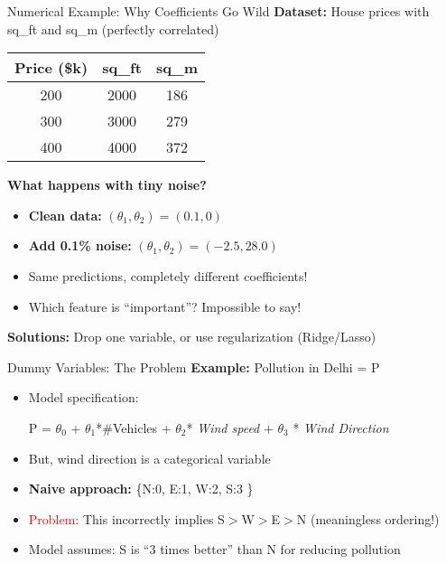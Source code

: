\documentclass{beamer}
\begin{document}
    \begin{frame}{Numerical Example: Why Coefficients Go Wild}
    \textbf{Dataset:} House prices with sq\_ft and sq\_m (perfectly correlated)
    
    \begin{center}
    \begin{tabular}{|c|c|c|}
    \hline
    Price (\$k) & sq\_ft & sq\_m \\
    \hline
    200 & 2000 & 186 \\
    300 & 3000 & 279 \\
    400 & 4000 & 372 \\
    \hline
    \end{tabular}
    \end{center}
    
    \pause
    \textbf{What happens with tiny noise?}
    \begin{itemize}[<+->]
        \item \textbf{Clean data:} $(\theta_1, \theta_2) = (0.1, 0)$
        \item \textbf{Add 0.1\% noise:} $(\theta_1, \theta_2) = (-2.5, 28.0)$
        \item Same predictions, completely different coefficients!
        \item Which feature is ``important''? Impossible to say!
    \end{itemize}
    
    \pause
    \begin{keypointsbox}{}
    \textbf{Solutions:} Drop one variable, or use regularization (Ridge/Lasso)
    \end{keypointsbox}
    \end{frame}
    
    \begin{frame}{Dummy Variables: The Problem}
    \textbf{Example:} Pollution in Delhi = P
    \begin{itemize}[<+->]
        \item Model specification:
            \begin{center}
            P = $\theta_{0}$ + $\theta_{1}$*\#Vehicles + $\theta_{2}$*
            \textit{Wind speed} + $\theta_{3}$ * \textit{Wind Direction}
            \end{center}
        \item But, wind direction is a categorical variable
        \item \textbf{Naive approach:} \{N:0, E:1, W:2, S:3 \}
        \item \textcolor{red}{Problem:} This incorrectly implies S$>$W$>$E$>$N (meaningless ordering!)
        \item Model assumes: S is ``3 times better'' than N for reducing pollution
    \end{itemize}
    \end{frame}
    
\end{document}
